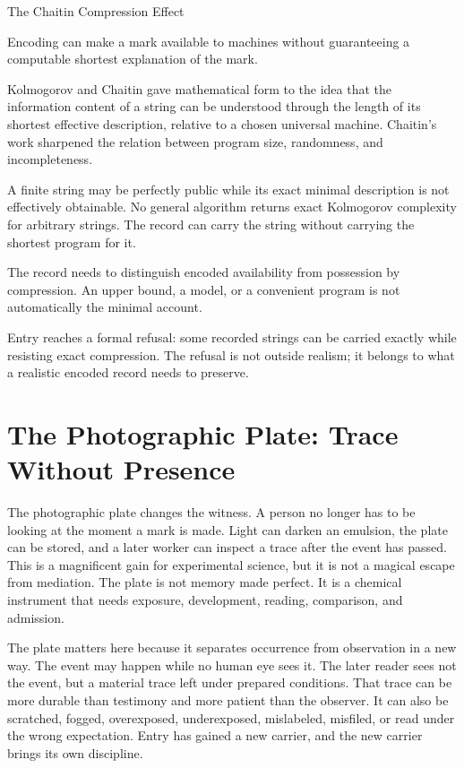 \begin{phenom}{The Chaitin Compression Effect~\cite{chaitin1974,kolmogorov1965}}
\label{ph:chaitin-compression}

\PhStatement
Encoding can make a mark available to machines without guaranteeing a
computable shortest explanation of the mark.

\PhOrigin
Kolmogorov and Chaitin gave mathematical form to the idea that the
information content of a string can be understood through the length of
its shortest effective description, relative to a chosen universal
machine. Chaitin's work sharpened the relation between program size,
randomness, and incompleteness.

\PhObservation
A finite string may be perfectly public while its exact minimal description
is not effectively obtainable. No general algorithm returns exact Kolmogorov
complexity for arbitrary strings. The record can carry the string without
carrying the shortest program for it.

\PhConstraint
The record needs to distinguish encoded availability from possession by
compression. An upper bound, a model, or a convenient program is not
automatically the minimal account.

\PhConsequence
Entry reaches a formal refusal: some recorded strings can be carried
exactly while resisting exact compression. The refusal is not outside
realism; it belongs to what a realistic encoded record needs to preserve.
\end{phenom}

\section{The Photographic Plate: Trace Without Presence}

The photographic plate changes the witness. A person no longer has to be
looking at the moment a mark is made. Light can darken an emulsion, the plate
can be stored, and a later worker can inspect a trace after the event has
passed. This is a magnificent gain for experimental science, but it is not a
magical escape from mediation. The plate is not memory made perfect. It is a
chemical instrument that needs exposure, development, reading, comparison,
and admission.

The plate matters here because it separates occurrence from observation in a
new way. The event may happen while no human eye sees it. The later reader sees
not the event, but a material trace left under prepared conditions. That trace
can be more durable than testimony and more patient than the observer. It can
also be scratched, fogged, overexposed, underexposed, mislabeled, misfiled, or
read under the wrong expectation. Entry has gained a new carrier, and the new
carrier brings its own discipline.

